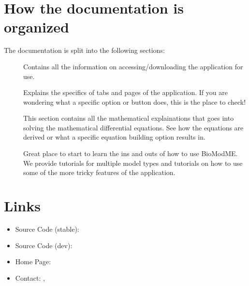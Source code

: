 \documentclass[letterpaper,10pt,english]{sphinxmanual}
\begin{document}
\chapter{How the documentation is organized}
\label{\detokenize{index:how-the-documentation-is-organized}}
\sphinxAtStartPar
The documentation is split into the following sections:
\begin{description}
\item[{}] \leavevmode
\sphinxAtStartPar
Contains all the information on accessing/downloading the application for
use.

\item[{}] \leavevmode
\sphinxAtStartPar
Explains the specifics of tabs and pages of the application. If you are
wondering what a specific option or button does, this is the place to check!

\item[{}] \leavevmode
\sphinxAtStartPar
This section contains all the mathematical explainations that goes into
solving the mathematical differential equations. See how the equations are
derived or what a specific equation building option results in.

\item[{}] \leavevmode
\sphinxAtStartPar
Great place to start to learn the ins and outs of how to use BioModME. We
provide tutorials for multiple model types and tutorials on how to use some
of the more tricky features of the application.

\end{description}


\chapter{Links}
\label{\detokenize{index:links}}\begin{itemize}
\item {} 
\sphinxAtStartPar
Source Code (stable): 

\item {} 
\sphinxAtStartPar
Source Code (dev): 

\item {} 
\sphinxAtStartPar
Home Page: 

\item {} 
\sphinxAtStartPar
Contact: , 

\end{itemize}



\renewcommand{\indexname}{Index}
\printindex
\end{document}
